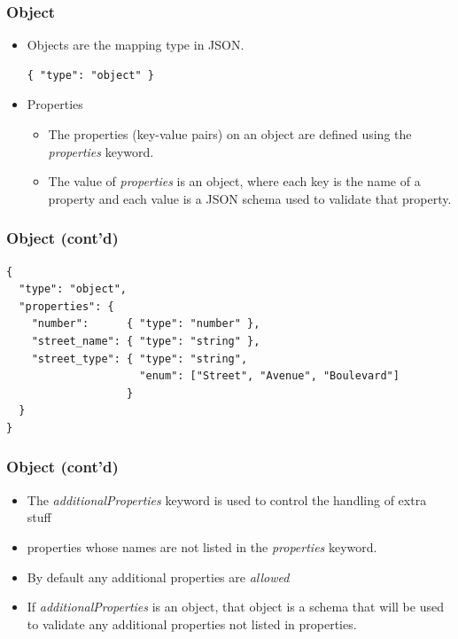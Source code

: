 \documentclass{efd-lecture}
\begin{document}
\begin{frame}[fragile]
  \frametitle{Object}
  \begin{itemize}
    \item Objects are the mapping type in JSON.
    \begin{verbatim}
{ "type": "object" }
    \end{verbatim}
    \item Properties
    \begin{itemize}
      \item
        The properties (key-value pairs) on an object are defined using the
        \textit{\color{YellowOrange}properties} keyword.
      \item
        The value of \textit{\color{YellowOrange}properties} is an object,
        where each key is the name of a property and each value is a JSON
        schema used to validate that property.
    \end{itemize}
  \end{itemize}
\end{frame}

\begin{frame}[fragile]
  \frametitle{Object (cont'd)}
  \scriptsize
  \begin{verbatim}
{
  "type": "object",
  "properties": {
    "number":      { "type": "number" },
    "street_name": { "type": "string" },
    "street_type": { "type": "string",
                     "enum": ["Street", "Avenue", "Boulevard"]
                   }
  }
}
  \end{verbatim}
\end{frame}

\begin{frame}
  \frametitle{Object (cont'd)}
  \begin{itemize}
    \item
      The \textit{\color{Purple}additionalProperties} keyword is used
      to control the handling of extra stuff

    \item
      properties whose names are not listed in the
      \textit{\color{YellowOrange}properties} keyword.

    \item
      By default any additional properties are
      \textit{\color{LimeGreen}allowed}

    \item
      If \textit{\color{Purple}additionalProperties} is an object,
      that object is a schema that will be used to validate any additional
      properties not listed in properties.

  \end{itemize}
\end{frame}
\end{document}

